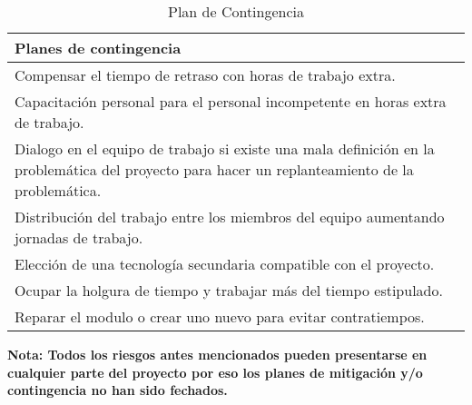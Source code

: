\begin{table}[h]
	\begin{center}
		\begin{tabular}{|p{14.2cm}|}
			\hline \rowcolor[RGB]{51,153,255} 
				\textcolor{blanco}{\bf Planes de contingencia} \\
			\hline 
				Compensar el tiempo de retraso con horas de trabajo extra. \\
      		\hline \rowcolor[RGB]{240,248,255}
				Capacitación personal para el personal incompetente en horas extra de trabajo. \\
			\hline 
				Dialogo en el  equipo de trabajo si existe una mala definición en la problemática del proyecto para hacer un replanteamiento de la problemática. \\ 
			\hline \rowcolor[RGB]{240,248,255}
				Distribución del trabajo entre los miembros del equipo aumentando jornadas de trabajo. \\ 
			\hline 
				Elección de una tecnología secundaria compatible con el proyecto. \\ 
			\hline \rowcolor[RGB]{240,248,255}
				Ocupar la holgura de tiempo y trabajar más del tiempo estipulado. \\ 
			\hline
				Reparar el modulo o crear uno nuevo para evitar contratiempos. \\ 
			\hline
		\end{tabular}
	\end{center}
	\caption[Plan de Contingencia]{Plan de Contingencia} 
	\label{tab:planContingencia}
\end{table}

\begin{center}
	{\bf \small Nota: Todos los riesgos antes mencionados pueden presentarse en cualquier parte}
	{\bf \small del proyecto por eso  los planes de mitigación y/o contingencia no han sido fechados.}
\end{center} 